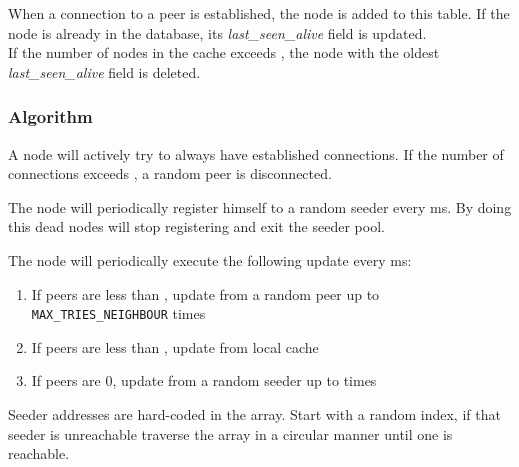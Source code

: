 \documentclass[../documentation.tex]{subfiles}
\begin{document}
When a connection to a peer is established, the node is added to this table.
If the node is already in the database, its \textit{last\_seen\_alive} field is updated.
\\
If the number of nodes in the cache exceeds ,
the node with the oldest \textit{last\_seen\_alive} field is deleted.

\subsubsection{Algorithm}

A node will actively try to always have  established connections.
If the number of connections exceeds , a random peer is disconnected.

The node will periodically register himself to a random seeder every  ms.
By doing this dead nodes will stop registering and exit the seeder pool.

The node will periodically execute the following update every  ms:

\begin{enumerate}
    \item If peers are less than , update from a random peer up to \texttt{MAX\_TRIES\_NEIGHBOUR} times
    \item If peers are less than , update from local cache
    \item If peers are \(0\), update from a random seeder up to  times
\end{enumerate}

\pagebreak

Seeder addresses are hard-coded in the  array.
Start with a random index, if that seeder is unreachable traverse the array in a circular manner
until one is reachable.


\begin{center}
\end{center}
\end{document}
